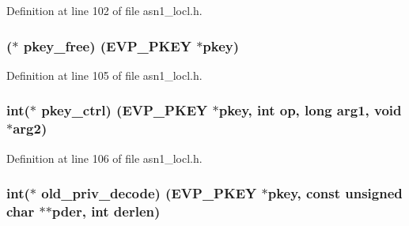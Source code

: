Definition at line 102 of file asn1\+\_\+locl.\+h.

\subsubsection[{\texorpdfstring{pkey\+\_\+free}{pkey_free}}]{($\ast$ pkey\+\_\+free) ({\bf E\+V\+P\+\_\+\+P\+K\+EY} $\ast$pkey)}\hypertarget{structevp__pkey__asn1__method__st_ade373bc70f2592c436e4716ad8b6e277}{}\label{structevp__pkey__asn1__method__st_ade373bc70f2592c436e4716ad8b6e277}


Definition at line 105 of file asn1\+\_\+locl.\+h.

\subsubsection[{\texorpdfstring{pkey\+\_\+ctrl}{pkey_ctrl}}]{\setlength{\rightskip}{0pt plus 5cm}int($\ast$ pkey\+\_\+ctrl) ({\bf E\+V\+P\+\_\+\+P\+K\+EY} $\ast$pkey, int op, long arg1, {\bf void} $\ast$arg2)}\hypertarget{structevp__pkey__asn1__method__st_a23991b62d00ce10d70df44f0f8726282}{}\label{structevp__pkey__asn1__method__st_a23991b62d00ce10d70df44f0f8726282}


Definition at line 106 of file asn1\+\_\+locl.\+h.

\subsubsection[{\texorpdfstring{old\+\_\+priv\+\_\+decode}{old_priv_decode}}]{\setlength{\rightskip}{0pt plus 5cm}int($\ast$ old\+\_\+priv\+\_\+decode) ({\bf E\+V\+P\+\_\+\+P\+K\+EY} $\ast$pkey, const unsigned char $\ast$$\ast$pder, int derlen)}\hypertarget{structevp__pkey__asn1__method__st_a5f9671537b5ac6f82cf91215eacaf72b}{}\label{structevp__pkey__asn1__method__st_a5f9671537b5ac6f82cf91215eacaf72b}


